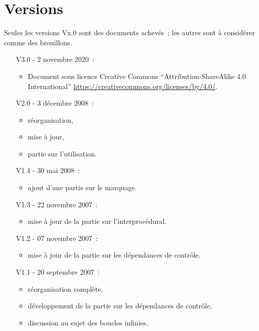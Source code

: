 \section*{Versions}

\begin{small}
Seules les versions Vx.0 sont des documents achevés~;
les autres sont à considérer comme des brouillons.

\begin{enumerate}
  \item[V3.0 -] 2 novembre 2020~:
    \begin{itemize}
    \item Document sous licence Creative Commons
      ``Attribution-ShareAlike 4.0 International''
      \url{https://creativecommons.org/licenses/by/4.0/}.
    \end{itemize}
  \item[V2.0 -] 3 décembre 2008~:
    \begin{itemize}
      \item réorganisation,
      \item mise à jour,
      \item partie sur l'utilisation.
    \end{itemize}
  \item[V1.4 - ] 30 mai 2008~:
    \begin{itemize}
      \item ajout d'une partie sur le marquage.
    \end{itemize}
  \item[V1.3 - ] 22 novembre 2007~:
    \begin{itemize}
      \item mise à jour de la partie sur l'interprocédural.
    \end{itemize}
  \item[V1.2 - ] 07 novembre 2007~:
    \begin{itemize}
      \item mise à jour de la partie sur les dépendances de contrôle.
    \end{itemize}
  \item[V1.1 - ] 20 septembre 2007~:
    \begin{itemize}
      \item réorganisation complète,
      \item développement de la partie sur les dépendances de contrôle,
      \item discussion au sujet des boucles infinies.

\end{itemize}
\end{enumerate}
\end{small}
